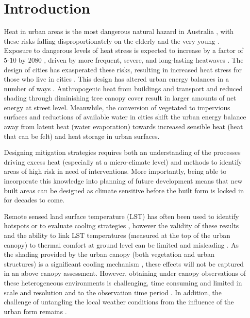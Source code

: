 \documentclass[final,3p,times,authoryear]{elsarticle}
\begin{document}
\maketitle





\section{Introduction}
Heat in urban areas is the most dangerous natural hazard in Australia \citep{Coates2014}, with these risks falling disproportionately on the elderly and the very young \citep{Nicholls2008}. Exposure to dangerous levels of heat stress is expected to increase by a factor of 5-10 by 2080 \citep{Coffel2018}, driven by more frequent, severe, and long-lasting heatwaves \citep{IPCC2013a}. The design of cities has exasperated these risks, resulting in increased heat stress for those who live in cities \citep{Coutts2012,Martilli2020}. This design has altered urban energy balances in a number of ways \citep{Oke1982}. Anthropogenic heat from buildings and transport and reduced shading through diminishing tree canopy cover result in larger amounts of net energy at street level. Meanwhile, the conversion of vegetated to impervious surfaces and reductions of available water in cities shift the urban energy balance away from latent heat (water evaporation) towards increased sensible heat (heat that can be felt) and heat storage in urban surfaces. 

Designing mitigation strategies requires both an understanding of the processes driving excess heat (especially at a micro-climate level) and methods to identify areas of high risk in need of interventions. More importantly, being able to incorporate this knowledge into planning of future development means that new built areas can be designed as climate sensitive before the built form is locked in for decades to come. 

Remote sensed land surface temperature (LST) has often been used to identify hotspots \citep{Aniello1995} or to evaluate cooling strategies \citep{Zhu2012a,Duncan2018,Manoli2019,Ossola2021}, however the validity of these results and the ability to link LST temperatures (measured at the top of the urban canopy) to thermal comfort at ground level can be limited and misleading  \citep{Coutts2016d}. As the shading provided by the urban canopy (both vegetation and urban structures) is a significant cooling mechanism \citep{Coutts2015,Lee2018,Krayenhoff2021}, these effects will not be captured in an above canopy assessment. However, obtaining under canopy observations of these heterogeneous environments is challenging, time consuming and limited in scale and resolution and to the observation time period \citep{Middel2019a}. In addition, the challenge of untangling the local weather conditions from the influence of the urban form remains \citep{Potgieter2021}.
\end{document}
